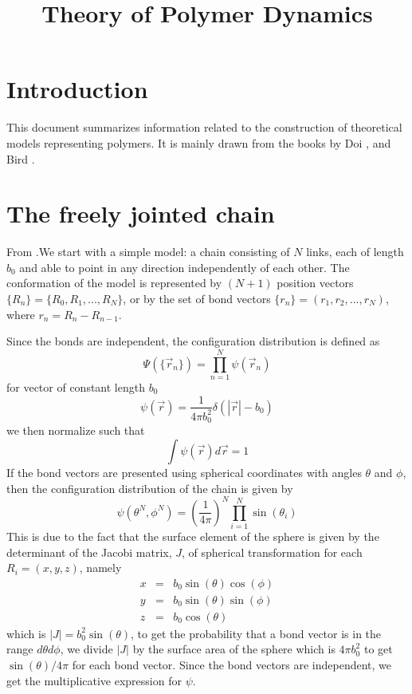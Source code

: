 \documentclass{report}
\begin{document}
\title{Theory of Polymer Dynamics}
\maketitle
\section{Introduction}
This document summarizes information related to the construction of theoretical models representing polymers. 
It is mainly drawn from the books by Doi \cite{doi1986theory}\cite{doi1996introduction}, and Bird \cite{bird1987dynamics}. 
 
\section{The freely jointed chain}\label{section_theFreelyJointedChain}
From \cite{doi1986theory}.We start with a simple model: a chain consisting of $N$ links, each of length $b_0$ and able to point in any direction independently of each other. The conformation of the model is represented by $(N+1)$ position vectors $\{R_n\}=\{R_0,R_1,...,R_{N}\}$, or by the set of bond vectors $\{r_n\}=(r_1,r_2,...,r_N)$, where $r_n=R_{n}-R_{n-1}$. 

Since the bonds are independent, the configuration distribution is defined as 
\begin{equation*} 
\Psi(\{\vec{r}_n\})=\prod_{n=1}^N\psi(\vec{r}_n)
\end{equation*}
for vector of constant length $b_0$
\begin{equation*}
\psi(\vec{r})=\frac{1}{4\pi b_0^2}\delta(|\vec{r}|-b_0)
\end{equation*}
we then normalize such that 
\begin{equation*}
\int \psi(\vec{r})d\vec{r} =1
\end{equation*}
If the bond vectors are presented using spherical coordinates with angles $\theta$ and $\phi$, then the configuration distribution of the chain is given by 
\begin{equation*}
\psi(\theta^{N},\phi^{N})=\left(\frac{1}{4\pi}\right)^{N} \prod_{i=1}^{N}\sin(\theta_i)
\end{equation*}
This is due to the fact that the surface element of the sphere is given by the determinant of the Jacobi matrix, $J$, of spherical transformation for each $R_i=(x,y,z)$, namely
\begin{eqnarray*}
x &=& b_0\sin(\theta)\cos(\phi)\\
y &=& b_0\sin(\theta)\sin(\phi)\\
z &=& b_0\cos(\theta) 
\end{eqnarray*} 
which is $|J|=b_0^2\sin(\theta)$, to get the probability that a bond vector is in the range $d\theta d\phi$, we divide $|J|$ by the surface area of the sphere which is $4\pi b_0^2$ to get $\sin(\theta)/4\pi$ for each bond vector. Since the bond vectors are independent, we get the multiplicative expression for $\psi$.
 
\end{document}
